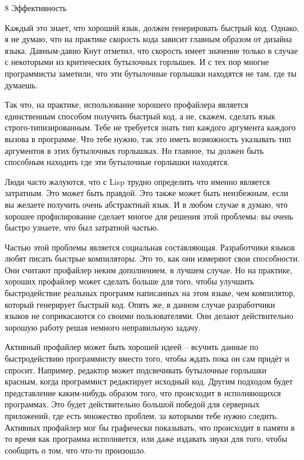 \documentclass[ebook,12pt,oneside,openany]{memoir}
\begin{document}
8 Эффективность

Каждый это знает, что хороший язык, должен генерировать быстрый код.
Однако, я не думаю, что на практике скорость кода зависит главным
образом от дизайна языка. Давным-давно Кнут отметил, что скорость
имеет значение только в случае с некоторыми из критических бутылочных
горлышек. И с тех пор многие программисты заметили, что эти бутылочные
горлышки находятся не там, где ты думаешь.

Так что, на практике, использование хорошего профайлера является
единственным способом получить быстрый код, а не, скажем, сделать язык
строго-типизированным. Тебе не требуется знать тип каждого аргумента
каждого вызова в программе. Что тебе нужно, так это иметь возможность
указывать тип аргументов в этих бутылочных горлышках. Но главное, ты
должен быть способным находить где эти бутылочные горлышки находятся.

Люди часто жалуются, что с Lisp трудно определить что именно является
затратным. Это может быть правдой. Это также может быть неизбежным,
если вы желаете получить очень абстрактный язык. И в любом случае я
думаю, что хорошее профилирование сделает многое для решения этой
проблемы: вы очень быстро узнаете, что был затратной частью.

Частью этой проблемы является социальная составляющая. Разработчики
языков любят писать быстрые компиляторы. Это то, как они измеряют свои
способности. Они считают профайлер неким дополнением, в лучшем случае.
Но на практике, хороших профайлер может сделать больше для того, чтобы
улучшить быстродействие реальных программ написанных на этом языке,
чем компилятор, который генерирует быстрый код. Опять же, в данном
случае разработчики языков не соприкасаются со своими пользователями.
Они делают действительно хорошую работу решая немного неправильную
задачу.

Активный профайлер может быть хорошей идеей -- всучить данные по
быстродействию программисту вместо того, чтобы ждать пока он сам
придёт и спросит. Например, редактор может подсвечивать бутылочные
горлышки красным, когда программист редактирует исходный код. Другим
подходом будет представление каким-нибудь образом того, что происходит
в исполняющихся программах. Это будет действительно большой победой
для серверных приложений, где есть множество проблем, за которыми тебе
нужно следить. Активных профайлер мог бы графически показывать, что
происходит в памяти в то время как программа исполняется, или даже
издавать звуки для того, чтобы сообщить о том, что что-то произошло.
\end{document}

